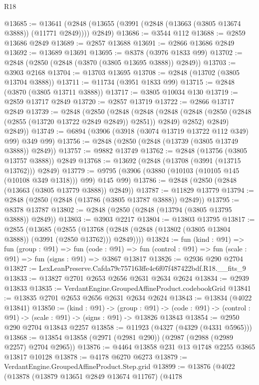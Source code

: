 \begin{lexlean}{R18}
\begin{coremodule}
@13685 := @13641 (@2848 (@13655 (@3991 (@2848 (@13663 (@3805 @13674 @3888)) (@11771 @2849)))) @2849)
@13686 := @3544 @112
@13688 := @2859 @13686 @2849
@13689 := @2857 @13688
@13691 := @2866 @13686 @2849
@13692 := @13689 @13691
@13695 := @8378 (@3976 @1833 @99)
@13702 := @2848 (@2850 (@2848 (@3870 (@3805 @13695 @3888)) @2849))
@13703 := @3903 @2168
@13704 := @13703 @13695
@13708 := @2848 (@13702 (@3805 @13704 @3888))
@13711 := @11734 (@3951 @1833 @99)
@13715 := @2848 (@3870 (@3805 @13711 @3888))
@13717 := @3805 @10034 @130
@13719 := @2859 @13717 @2849
@13720 := @2857 @13719
@13722 := @2866 @13717 @2849
@13739 := @2848
    (@2850
      (@2848
        (@2848
          (@2848 (@2848 (@2850 (@2848 (@2855 (@13720 @13722 @2849 @2849)) @2851)) @2849) @2852)
          @2849)
        @2849))
@13749 := @6894 (@3906 (@3918 (@3074 @13719 @13722 @112 @349) @99) @349 @99)
@13756 := @2848 (@2850 (@2848 (@13739 (@3805 @13749 @3888)) @2849))
@13757 := @9882 @13749
@13762 := @2848 (@13756 (@3805 @13757 @3888)) @2849
@13768 := @13692 (@2848 (@13708 (@3991 (@13715 @13762))) @2849)
@13779 := @9795 (@3906 (@3880 (@10103 (@10105 @145 (@10108 @349 @1318))) @99) @145 @99)
@13786 := @2848 (@2850 (@2848 (@13663 (@3805 @13779 @3888)) @2849))
@13787 := @11829 @13779
@13794 := @2848 (@2850 (@2848 (@13786 (@3805 @13787 @3888)) @2849))
@13795 := @8378 @13787
@13802 := @2848 (@2850 (@2848 (@13794 (@3805 @13795 @3888)) @2849))
@13803 := @3903 @2217
@13804 := @13803 @13795
@13817 := @2855
    (@13685
      (@2855 (@13768 (@2848 (@2848 (@13802 (@3805 @13804 @3888)) (@3991 (@2850 @13762))) @2849))))
@13824 := fun (kind : @91) =>
  fun (group : @91) =>
  fun (code : @91) => fun (control : @91) => fun (scale : @91) => fun (signs : @91) => @3867 @13817
@13826 := @2936 @290 @2704
@13827 := LexLeanPreserve.Cafda79c757163ffe4c6f07f487422bdf.R18.__fits_9
@13833 := @13827 @2701 @2653 @2656 @2631 @2634 @2624
@13834 := @2939 @13833
@13835 := VerdantEngine.GroupedAffineProduct.codebookGrid
@13841 := @13835 @2701 @2653 @2656 @2631 @2634 @2624
@13843 := @13834 (@4022 @13841)
@13850 := (kind : @91) ->
  (group : @91) ->
  (code : @91) -> (control : @91) -> (scale : @91) -> (signs : @91) -> @13826 @13843
@13854 := @2950 @290 @2704 @13843 @2257
@13858 := @11923 (@4327 (@4329 (@4331 @5965)))
@13868 := @13854 @13858 (@2971 (@2981 @290)) (@2987 (@2988 (@2989 @2257) @2704 @2965))
@13876 := @4464 @13858 @231 @13 @1748 @2255 @3865 @13817 @10128
@13878 := @4178 @6270 @6273
@13879 := VerdantEngine.GroupedAffineProduct.Step.grid
@13899 := @13876
    (@4022
      (@13878
        (@13879 @13651 @2849 @13674 @11767)
        (@4178

\end{coremodule}
\end{lexlean}
